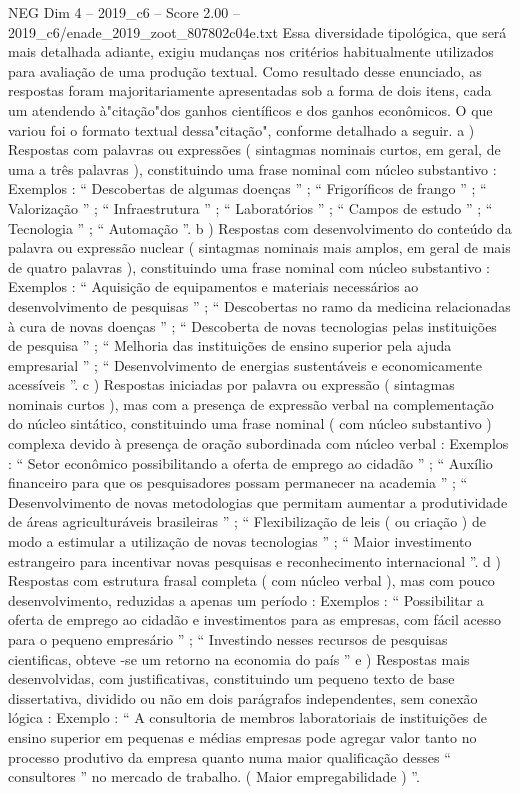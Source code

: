 \begin{textsample}{NEG Dim 4 – 2019\_c6 – Score 2.00 – 2019\_c6/enade\_2019\_zoot\_807802c04e.txt}
Essa diversidade tipológica, que será mais detalhada adiante, exigiu mudanças nos critérios habitualmente utilizados para avaliação de uma produção textual.
Como resultado desse enunciado, as respostas foram majoritariamente apresentadas sob a forma de dois itens, cada um atendendo à"citação"dos ganhos científicos e dos ganhos econômicos.
O que variou foi o formato textual dessa"citação", conforme detalhado a seguir. a ) Respostas com palavras ou expressões ( sintagmas nominais curtos, em geral, de uma a três palavras ), constituindo uma frase nominal com núcleo substantivo : Exemplos : “ Descobertas de algumas doenças ” ; “ Frigoríficos de frango ” ; “ Valorização ” ; “ Infraestrutura ” ; “ Laboratórios ” ; “ Campos de estudo ” ; “ Tecnologia ” ; “ Automação ”. b ) Respostas com desenvolvimento do conteúdo da palavra ou expressão nuclear ( sintagmas nominais mais amplos, em geral de mais de quatro palavras ), constituindo uma frase nominal com núcleo substantivo : Exemplos : “ Aquisição de equipamentos e materiais necessários ao desenvolvimento de pesquisas ” ; “ Descobertas no ramo da medicina relacionadas à cura de novas doenças ” ; “ Descoberta de novas tecnologias pelas instituições de pesquisa ” ; “ Melhoria das instituições de ensino superior pela ajuda empresarial ” ; “ Desenvolvimento de energias sustentáveis e economicamente acessíveis ”. c ) Respostas iniciadas por palavra ou expressão ( sintagmas nominais curtos ), mas com a presença de expressão verbal na complementação do núcleo sintático, constituindo uma frase nominal ( com núcleo substantivo ) complexa devido à presença de oração subordinada com núcleo verbal : Exemplos : “ Setor econômico possibilitando a oferta de emprego ao cidadão ” ; “ Auxílio financeiro para que os pesquisadores possam permanecer na academia ” ; “ Desenvolvimento de novas metodologias que permitam aumentar a produtividade de áreas agriculturáveis brasileiras ” ; “ Flexibilização de leis ( ou criação ) de modo a estimular a utilização de novas tecnologias ” ; “ Maior investimento estrangeiro para incentivar novas pesquisas e reconhecimento internacional ”. d ) Respostas com estrutura frasal completa ( com núcleo verbal ), mas com pouco desenvolvimento, reduzidas a apenas um período : Exemplos : “ Possibilitar a oferta de emprego ao cidadão e investimentos para as empresas, com fácil acesso para o pequeno empresário ” ; “ Investindo nesses recursos de pesquisas cientificas, obteve -se um retorno na economia do país ” e ) Respostas mais desenvolvidas, com justificativas, constituindo um pequeno texto de base dissertativa, dividido ou não em dois parágrafos independentes, sem conexão lógica : Exemplo : “ A consultoria de membros laboratoriais de instituições de ensino superior em pequenas e médias empresas pode agregar valor tanto no processo produtivo da empresa quanto numa maior qualificação desses “ consultores ” no mercado de trabalho. ( Maior empregabilidade ) ”.

\end{textsample}
